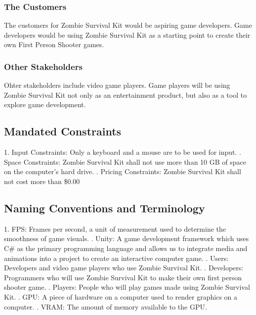 \documentclass[12pt, titlepage]{article}
\begin{document}
\subsubsection{The Customers}
The customers for Zombie Survival Kit would be aspiring game developers.
\newline
Game developers would be using Zombie Survival Kit as a starting point to create their own First Person Shooter games.
\subsubsection{Other Stakeholders}
Ohter stakeholders include video game players. Game players will be using Zombie Survival Kit not only as an entertainment product, but also as a tool to explore game development.
\subsection{Mandated Constraints}
1. Input Constraints: Only a keyboard and a mouse are to be used for input.
\newline
{}. Space Constraints: Zombie Survival Kit shall not use more than 10 GB of space on the computer’s hard drive.
\newline
{}. Pricing Constraints: Zombie Survival Kit shall not cost more than \$0.00

\subsection{Naming Conventions and Terminology}
1. FPS: Frames per second, a unit of measurement used to determine the smoothness of game visuals.
\newline
{}. Unity: A game development framework which uses C\# as the primary programming language and allows us to integrate media and animations into a project to create an interactive computer game. 
\newline
{}. Users: Developers and video game players who use Zombie Survival Kit. 
\newline
{}. Developers: Programmers who will use Zombie Survival Kit to make their own first person shooter game. 
\newline
{}. Players: People who will play games made using Zombie Survival Kit. 
\newline
{}. GPU: A piece of hardware on a computer used to render graphics on a computer. 
\newline
{}. VRAM: The amount of memory available to the GPU. 
\end{document}
